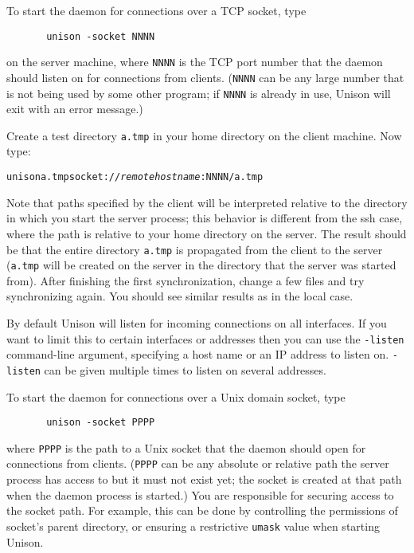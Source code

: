 \documentclass{article}
\newcommand{\NT}[1]{\textit{#1}}
\begin{document}
To start the daemon for connections over a TCP socket, type
\begin{verbatim}
       unison -socket NNNN
\end{verbatim}
on the server machine, where {\tt NNNN} is the TCP port number that the
daemon should listen on for connections from clients.  ({\tt NNNN} can
be any large number that is not being used by some other program; if
\texttt{NNNN} is already in use, Unison will exit with an error
message.)

Create a test directory {\tt a.tmp} in your home directory on the
client machine.  Now type:
\begin{alltt}
       unison a.tmp socket://\NT{remotehostname}:NNNN/a.tmp
\end{alltt}
Note that paths specified by the client will be interpreted relative
to the directory in which you start the server process; this behavior
is different from the ssh case, where the path is relative to your home
directory on the server.
%
The result should be that the entire directory {\tt a.tmp} is
propagated from the client to the server (\texttt{a.tmp} will be
created on the server in the directory that the server was started
from).
%
After finishing the first synchronization, change a few files and try
synchronizing again.  You should see similar results as in the local
case.

By default Unison will listen for incoming connections on all interfaces.
If you want to limit this to certain interfaces or addresses then you
can use the {\tt -listen} command-line argument, specifying a host name
or an IP address to listen on. {\tt -listen} can be given multiple
times to listen on several addresses.


To start the daemon for connections over a Unix domain socket, type
\begin{verbatim}
       unison -socket PPPP
\end{verbatim}
where {\tt PPPP} is the path to a Unix socket that the daemon should
open for connections from clients.  ({\tt PPPP} can be any absolute or
relative path the server process has access to but it must not exist
yet; the socket is created at that path when the daemon process is
started.)  You are responsible for securing access to the socket path.
For example, this can be done by controlling the permissions of
socket's parent directory, or ensuring a restrictive {\tt umask} value
when starting Unison.
\end{document}
